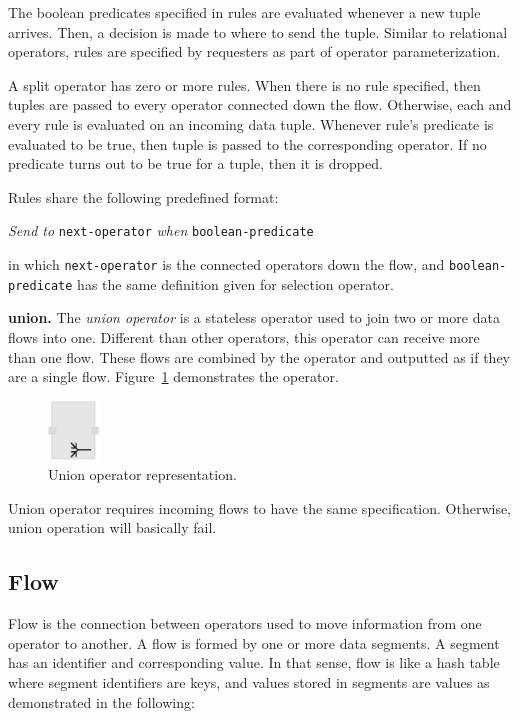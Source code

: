 The boolean predicates specified in rules are evaluated whenever a new tuple 
arrives. Then, a decision is made to where to send the tuple. Similar to relational 
operators, rules are specified by requesters as part of operator 
parameterization.

A split operator has zero or more rules. When there is no rule specified, then 
tuples are passed to every operator connected down the flow. Otherwise, each 
and every rule is evaluated on an incoming data tuple. Whenever rule's predicate 
is evaluated to be true, then tuple is passed to the corresponding operator. If no 
predicate turns out to be true for a tuple, then it is dropped.

Rules share the following predefined format:

\textit{Send to} \texttt{next-operator} \textit{when} \texttt{boolean-predicate}

in which \texttt{next-operator} is the connected operators down the flow, and 
\texttt{boolean-predicate} has the same definition given for selection operator.

\textbf{union.}
The \textit{union operator} is a stateless operator used to join two or more data flows 
into one. Different than other operators, this operator can receive more than one flow. 
These flows are combined by the operator and outputted as if they are a single flow. 
Figure~\ref{fig:union operator} demonstrates the operator.

\begin{figure}[ht]
	\centering
	\includegraphics[height=60px]{figures/UnionOperator.pdf}
	\caption{Union operator representation.}
	\label{fig:union operator}
\end{figure}

Union operator requires incoming flows to have the same specification. Otherwise, 
union operation will basically fail.

\subsection{Flow}
Flow is the connection between operators used to move information from one operator 
to another. A flow is formed by one or more data segments. A segment has an identifier 
and corresponding value. In that sense, flow is like a hash table where segment identifiers 
are keys, and values stored in segments are values as demonstrated in the following:

